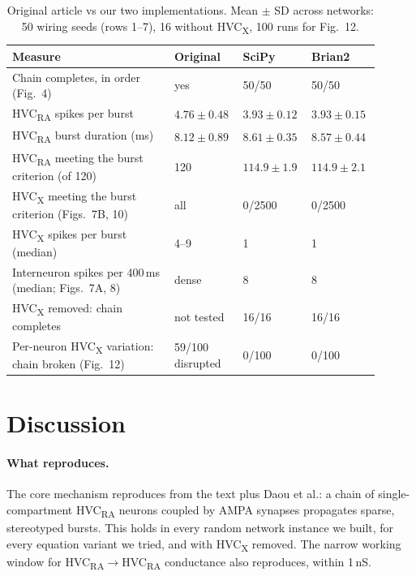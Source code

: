 \begin{table}[h]\small
\caption{Original article vs our two implementations. Mean $\pm$ SD across networks: 50 wiring
seeds (rows 1--7), 16 without HVC\textsubscript{X}, 100 runs for Fig.~12.}
\label{tab:brian2}
\begin{tabular}{p{0.42\linewidth}p{0.16\linewidth}p{0.16\linewidth}p{0.16\linewidth}}
\hline
Measure & Original & SciPy & Brian2 \\ \hline
Chain completes, in order (Fig.~4) & yes & 50/50 & 50/50 \\
HVC\textsubscript{RA} spikes per burst & $4.76\pm0.48$ & $3.93\pm0.12$ & $3.93\pm0.15$ \\
HVC\textsubscript{RA} burst duration (ms) & $8.12\pm0.89$ & $8.61\pm0.35$ & $8.57\pm0.44$ \\
HVC\textsubscript{RA} meeting the burst criterion (of 120) & 120 & $114.9\pm1.9$ & $114.9\pm2.1$ \\
HVC\textsubscript{X} meeting the burst criterion (Figs.~7B, 10) & all & 0/2500 & 0/2500 \\
HVC\textsubscript{X} spikes per burst (median) & 4--9 & 1 & 1 \\
Interneuron spikes per 400\,ms (median; Figs.~7A, 8) & dense & 8 & 8 \\
HVC\textsubscript{X} removed: chain completes & not tested & 16/16 & 16/16 \\
Per-neuron HVC\textsubscript{X} variation: chain broken (Fig.~12) & 59/100 disrupted & 0/100 & 0/100 \\ \hline
\end{tabular}
\end{table}

\section*{Discussion}

\paragraph{What reproduces.} The core mechanism reproduces from the text plus Daou et
al.\supercite{Daou2013}: a chain of single-compartment HVC\textsubscript{RA} neurons coupled by
AMPA synapses propagates sparse, stereotyped bursts. This holds in every random network instance
we built, for every equation variant we tried, and with HVC\textsubscript{X} removed. The narrow
working window for HVC\textsubscript{RA}$\to$HVC\textsubscript{RA} conductance also reproduces,
within 1\,nS.

